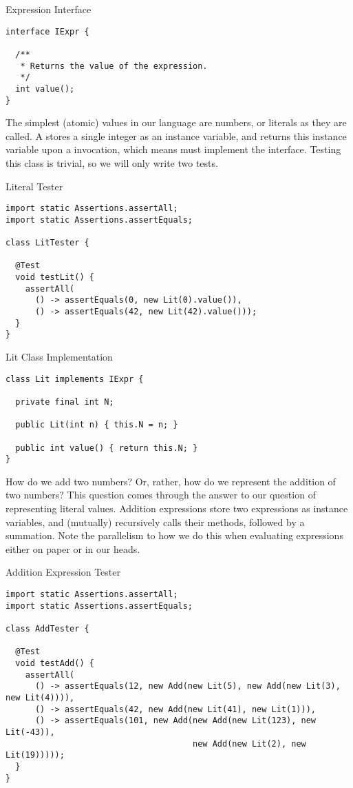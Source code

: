 \begin{cl}[]{Expression Interface}
\begin{lstlisting}[language=MyJava]
interface IExpr {

  /**
   * Returns the value of the expression.
   */
  int value();
}
\end{lstlisting}
\end{cl}

The simplest (atomic) values in our language are numbers, or literals as they are called. A  stores a single integer as an instance variable, and returns this instance variable upon a  invocation, which means  must implement the  interface. Testing this class is trivial, so we will only write two tests.

\begin{cl}[]{Literal Tester}
\begin{lstlisting}[language=MyJava]
import static Assertions.assertAll;
import static Assertions.assertEquals;

class LitTester {

  @Test
  void testLit() {
    assertAll(
      () -> assertEquals(0, new Lit(0).value()),      
      () -> assertEquals(42, new Lit(42).value()));
  }
}
\end{lstlisting}
\end{cl}

\begin{cl}[]{Lit Class Implementation}
\begin{lstlisting}[language=MyJava]
class Lit implements IExpr {

  private final int N;

  public Lit(int n) { this.N = n; }

  public int value() { return this.N; }
}
\end{lstlisting}
\end{cl}

How do we add two numbers? Or, rather, how do we represent the addition of two numbers? This question comes through the answer to our question of representing literal values. Addition expressions store two  expressions as instance variables, and (mutually) recursively calls their  methods, followed by a summation. Note the parallelism to how we do this when evaluating expressions either on paper or in our heads.

\begin{cl}[]{Addition Expression Tester}
\begin{lstlisting}[language=MyJava]
import static Assertions.assertAll;
import static Assertions.assertEquals;

class AddTester {

  @Test
  void testAdd() {
    assertAll(
      () -> assertEquals(12, new Add(new Lit(5), new Add(new Lit(3), new Lit(4)))),
      () -> assertEquals(42, new Add(new Lit(41), new Lit(1))),
      () -> assertEquals(101, new Add(new Add(new Lit(123), new Lit(-43)),
                                      new Add(new Lit(2), new Lit(19)))));
  }
}
\end{lstlisting}
\end{cl}

